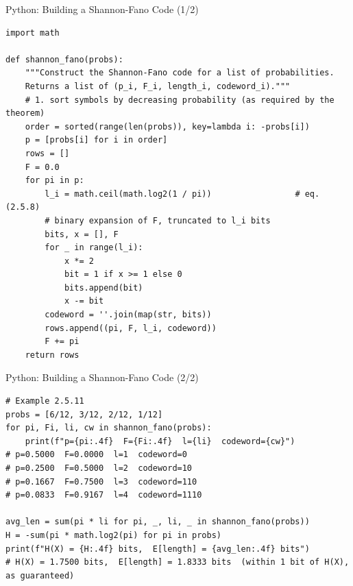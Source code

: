 \documentclass[aspectratio=169,10pt]{beamer}
\begin{document}
\begin{frame}[fragile]{Python: Building a Shannon-Fano Code (1/2)}
\begin{lstlisting}[style=python]
import math

def shannon_fano(probs):
    """Construct the Shannon-Fano code for a list of probabilities.
    Returns a list of (p_i, F_i, length_i, codeword_i)."""
    # 1. sort symbols by decreasing probability (as required by the theorem)
    order = sorted(range(len(probs)), key=lambda i: -probs[i])
    p = [probs[i] for i in order]
    rows = []
    F = 0.0
    for pi in p:
        l_i = math.ceil(math.log2(1 / pi))                 # eq. (2.5.8)
        # binary expansion of F, truncated to l_i bits
        bits, x = [], F
        for _ in range(l_i):
            x *= 2
            bit = 1 if x >= 1 else 0
            bits.append(bit)
            x -= bit
        codeword = ''.join(map(str, bits))
        rows.append((pi, F, l_i, codeword))
        F += pi
    return rows
\end{lstlisting}
\end{frame}

\begin{frame}[fragile]{Python: Building a Shannon-Fano Code (2/2)}
\begin{lstlisting}[style=python]
# Example 2.5.11
probs = [6/12, 3/12, 2/12, 1/12]
for pi, Fi, li, cw in shannon_fano(probs):
    print(f"p={pi:.4f}  F={Fi:.4f}  l={li}  codeword={cw}")
# p=0.5000  F=0.0000  l=1  codeword=0
# p=0.2500  F=0.5000  l=2  codeword=10
# p=0.1667  F=0.7500  l=3  codeword=110
# p=0.0833  F=0.9167  l=4  codeword=1110

avg_len = sum(pi * li for pi, _, li, _ in shannon_fano(probs))
H = -sum(pi * math.log2(pi) for pi in probs)
print(f"H(X) = {H:.4f} bits,  E[length] = {avg_len:.4f} bits")
# H(X) = 1.7500 bits,  E[length] = 1.8333 bits  (within 1 bit of H(X), as guaranteed)
\end{lstlisting}
\end{frame}
\end{document}
